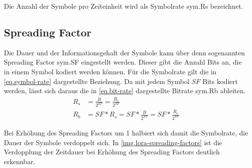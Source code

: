 Die Anzahl der Symbole pro Zeiteinheit wird als Symbolrate \gls{sym.Rs} bezeichnet.


\subsection{Spreading Factor}
Die Dauer und der Informationsgehalt der Symbole kann über denn sogenannten Spreading Factor \gls{sym.SF} eingestellt werden.
Dieser gibt die Anzahl Bits an, die in einem Symbol kodiert werden können.
Für die Symbolrate gilt die in \autoref{eq.symbol-rate} dargestellte Beziehung.
Da mit jedem Symbol $SF$ Bits kodiert werden, lässt sich daraus die in \autoref{eq.bit-rate} dargestellte Bitrate \gls{sym.Rb} ableiten.
\cite[S. 10]{loramodulation}
\begin{align}
	R_s & = \frac{B}{2^{SF}} = \frac{R_c}{2^{SF}} \label{eq.symbol-rate}\\
	R_b & = SF * R_s = SF * \frac{B}{2^{SF}} = SF * \frac{R_c}{2^{SF}} \label{eq.bit-rate}
\end{align}

Bei Erhöhung des Spreading Factors um 1 halbiert sich damit die Symbolrate, die Dauer der Symbole verdoppelt sich.
In \autoref{img.lora-spreading-factors} ist die Verdopplung der Zeitdauer bei Erhöhung des Spreading Factors deutlich erkennbar.

